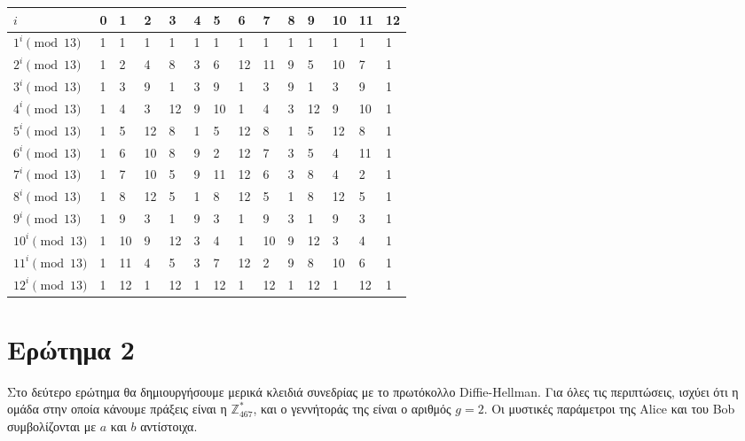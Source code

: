 \documentclass{article}
\begin{document}
\begin{longtable}[c]{l|l|l|l|l|l|l|l|l|l|l|l|l|l}
    $i$ & 0 & 1 & 2 & 3 & 4 & 5 & 6 & 7 & 8 & 9 & 10 & 11 & 12 \\ \hline
    ${ 1}^i \pmod {13}$ & 1 & 1 & 1 & 1 & 1 & 1 & 1 & 1 & 1 & 1 & 1 & 1 & 1 \\ \hline
    ${ 2}^i \pmod {13}$ & 1 & 2 & 4 & 8 & 3 & 6 & 12 & 11 & 9 & 5 & 10 & 7 & 1 \\ \hline
    ${ 3}^i \pmod {13}$ & 1 & 3 & 9 & 1 & 3 & 9 & 1 & 3 & 9 & 1 & 3 & 9 & 1 \\ \hline
    ${ 4}^i \pmod {13}$ & 1 & 4 & 3 & 12 & 9 & 10 & 1 & 4 & 3 & 12 & 9 & 10 & 1 \\ \hline
    ${ 5}^i \pmod {13}$ & 1 & 5 & 12 & 8 & 1 & 5 & 12 & 8 & 1 & 5 & 12 & 8 & 1 \\ \hline
    ${ 6}^i \pmod {13}$ & 1 & 6 & 10 & 8 & 9 & 2 & 12 & 7 & 3 & 5 & 4 & 11 & 1 \\ \hline
    ${ 7}^i \pmod {13}$ & 1 & 7 & 10 & 5 & 9 & 11 & 12 & 6 & 3 & 8 & 4 & 2 & 1 \\ \hline
    ${ 8}^i \pmod {13}$ & 1 & 8 & 12 & 5 & 1 & 8 & 12 & 5 & 1 & 8 & 12 & 5 & 1 \\ \hline
    ${ 9}^i \pmod {13}$ & 1 & 9 & 3 & 1 & 9 & 3 & 1 & 9 & 3 & 1 & 9 & 3 & 1 \\ \hline
    ${10}^i \pmod {13}$ & 1 & 10 & 9 & 12 & 3 & 4 & 1 & 10 & 9 & 12 & 3 & 4 & 1 \\ \hline
    ${11}^i \pmod {13}$ & 1 & 11 & 4 & 5 & 3 & 7 & 12 & 2 & 9 & 8 & 10 & 6 & 1 \\ \hline
    ${12}^i \pmod {13}$ & 1 & 12 & 1 & 12 & 1 & 12 & 1 & 12 & 1 & 12 & 1 & 12 & 1 \\
\end{longtable}

\section*{Ερώτημα 2}

Στο δεύτερο ερώτημα θα δημιουργήσουμε μερικά κλειδιά συνεδρίας με το πρωτόκολλο Diffie-Hellman. Για όλες τις περιπτώσεις, ισχύει ότι η ομάδα στην οποία κάνουμε πράξεις είναι η $\mathbb{Z}_{467}^*$, και ο γεννήτοράς της είναι ο αριθμός $g = 2$. Οι μυστικές παράμετροι της Alice και του Bob συμβολίζονται με $a$ και $b$ αντίστοιχα.
\end{document}
